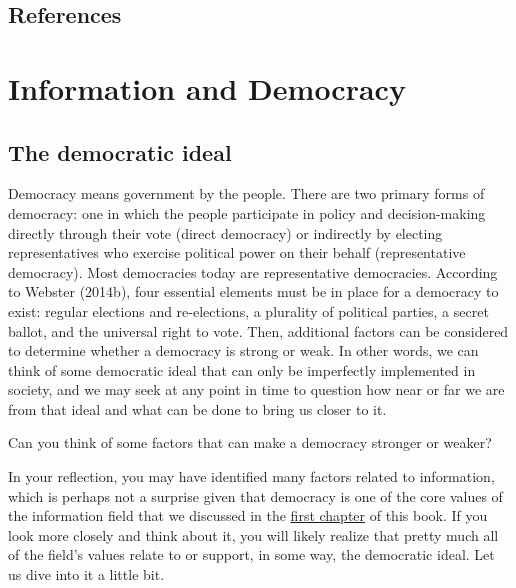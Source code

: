 \documentclass[
  letterpaper,
  DIV=11,
  numbers=noendperiod]{scrreprt}
\begin{document}
\section{References}\label{references-8}


\chapter{Information and Democracy}\label{information-and-democracy}

\section{The democratic ideal}\label{the-democratic-ideal}

Democracy means government by the people. There are two primary forms of
democracy: one in which the people participate in policy and
decision-making directly through their vote (direct democracy) or
indirectly by electing representatives who exercise political power on
their behalf (representative democracy). Most democracies today are
representative democracies. According to Webster (2014b), four essential
elements must be in place for a democracy to exist: regular elections
and re-elections, a plurality of political parties, a secret ballot, and
the universal right to vote. Then, additional factors can be considered
to determine whether a democracy is strong or weak. In other words, we
can think of some democratic ideal that can only be imperfectly
implemented in society, and we may seek at any point in time to question
how near or far we are from that ideal and what can be done to bring us
closer to it.

\begin{tcolorbox}[enhanced jigsaw, arc=.35mm, bottomrule=.15mm, bottomtitle=1mm, breakable, colback=white, colbacktitle=quarto-callout-tip-color!10!white, colframe=quarto-callout-tip-color-frame, coltitle=black, left=2mm, leftrule=.75mm, opacityback=0, opacitybacktitle=0.6, rightrule=.15mm, title=\textcolor{quarto-callout-tip-color}{\faLightbulb}\hspace{0.5em}{Stop and reflect}, titlerule=0mm, toprule=.15mm, toptitle=1mm]

Can you think of some factors that can make a democracy stronger or
weaker?

\end{tcolorbox}

In your reflection, you may have identified many factors related to
information, which is perhaps not a surprise given that democracy is one
of the core values of the information field that we discussed in the
\href{https://pmongeon.github.io/information-in-society/ch1.html\#roles-values-and-principles}{first
chapter} of this book. If you look more closely and think about it, you
will likely realize that pretty much all of the field's values relate to
or support, in some way, the democratic ideal. Let us dive into it a
little bit.
\end{document}
